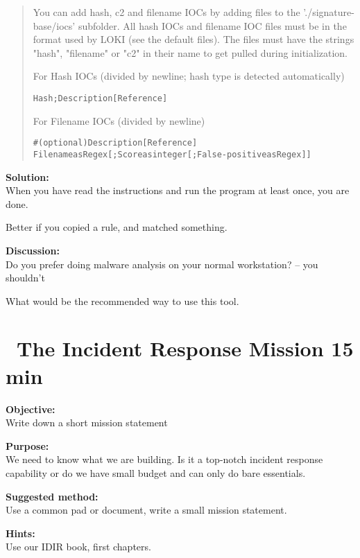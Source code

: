\documentclass[a4paper,11pt,notitlepage]{report}
\begin{document}
\begin{quote}
You can add hash, c2 and filename IOCs by adding files to the './signature-base/iocs' subfolder. All hash IOCs and filename IOC files must be in the format used by LOKI (see the default files). The files must have the strings "hash", "filename" or "c2" in their name to get pulled during initialization.

For Hash IOCs (divided by newline; hash type is detected automatically)

\begin{alltt}
Hash;Description [Reference]
\end{alltt}

For Filename IOCs (divided by newline)
\begin{alltt}
# (optional) Description [Reference]
Filename as Regex[;Score as integer[;False-positive as Regex]]
\end{alltt}
\end{quote}

{\bf Solution:}\\
When you have read the instructions and run the program at least once, you are done.

Better if you copied a rule, and matched something.

{\bf Discussion:}\\
Do you prefer doing malware analysis on your normal workstation? -- you shouldn't

What would be the recommended way to use this tool.


\chapter{\faExclamationTriangle\ The Incident Response Mission 15 min}
\label{ex:the-ir-mission}


{\bf Objective:}\\
Write down a short mission statement

{\bf Purpose:}\\
We need to know what we are building. Is it a top-notch incident response capability or do we have small budget and can only do bare essentials.


{\bf Suggested method:}\\
Use a common pad or document, write a small mission statement.

{\bf Hints:}\\
Use our IDIR book, first chapters.
\end{document}
